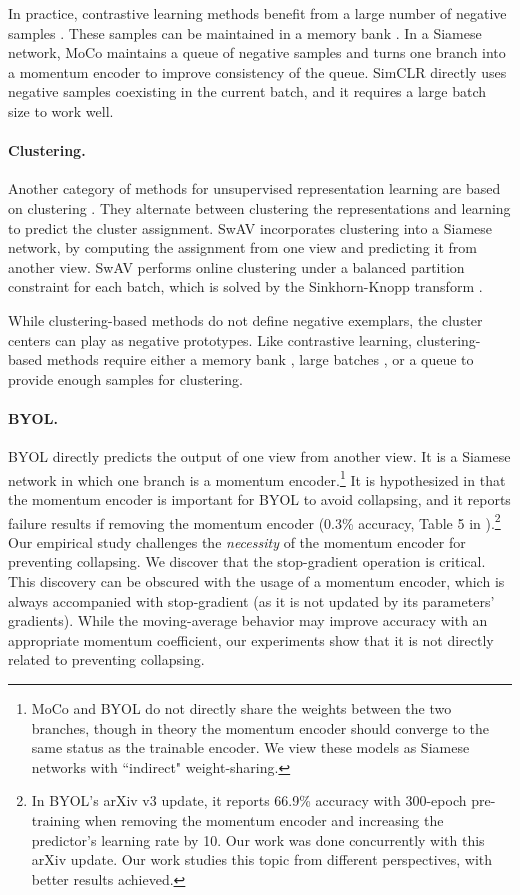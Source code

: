 \documentclass[final]{cvpr}
\begin{document}
In practice, contrastive learning methods benefit from a large number of negative samples \cite{Wu2018a,Tian2019,He2019a,Chen2020}. 
These samples can be maintained in a memory bank \cite{Wu2018a}. In a Siamese network, MoCo \cite{He2019a} maintains a queue of negative samples and turns one branch into a momentum encoder to improve consistency of the queue.
SimCLR \cite{Chen2020} directly uses negative samples coexisting in the current batch, and it requires a large batch size to work well.

\paragraph{Clustering.} Another category of methods for unsupervised representation learning are based on clustering \cite{Caron2018,Caron2019,Asano2019,Caron2020}.
They alternate between clustering the representations and learning to predict the cluster assignment.
SwAV \cite{Caron2020} incorporates clustering into a Siamese network, by computing the assignment from one view and predicting it from another view.
SwAV performs online clustering under a balanced partition constraint for each batch, which is solved by the Sinkhorn-Knopp transform \cite{Cuturi2013}.

While clustering-based methods do not define negative \mbox{exemplars}, the cluster centers can play as negative prototypes.
Like contrastive learning, clustering-based methods require either a memory bank \cite{Caron2018,Caron2019,Asano2019}, large batches \cite{Caron2020}, or a queue \cite{Caron2020} to provide enough samples for clustering.

\paragraph{BYOL.} BYOL \cite{Grill2020} directly predicts the output of one view from another view. It is a Siamese network in which one branch is a momentum encoder.\footnote{MoCo \cite{He2019a} and BYOL \cite{Grill2020} do not directly share the weights between the two branches, though in theory the momentum encoder should converge to the same status as the trainable encoder. We view these models as Siamese networks with ``indirect" weight-sharing.}
It is hypothesized in \cite{Grill2020} that the momentum encoder is important for BYOL to avoid collapsing, and it reports failure results if removing the momentum encoder (0.3\% accuracy, Table 5 in \cite{Grill2020}).\footnote{
In BYOL's arXiv v3 update, it reports 66.9\% accuracy with 300-epoch pre-training when removing the momentum encoder and increasing the predictor's learning rate by 10.
Our work was done concurrently with this arXiv update.
Our work studies this topic from different perspectives, with better results achieved.}
Our empirical study challenges the \emph{necessity} of the momentum encoder for preventing collapsing.
We discover that the stop-gradient operation is critical. This discovery can be obscured with the usage of a momentum encoder, which is always accompanied with stop-gradient (as it is not updated by its parameters' gradients). While the moving-average behavior may improve accuracy with an appropriate momentum coefficient, our experiments show that it is not directly related to preventing collapsing.
\end{document}
